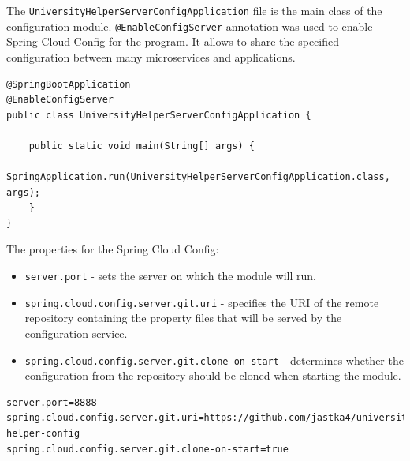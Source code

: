 The \texttt{UniversityHelperServerConfigApplication} file is the main class of the configuration module. \texttt{@EnableConfigServer} annotation was used to enable Spring Cloud Config for the program. It allows to share the specified configuration between many microservices and applications.

\begin{lstlisting}[label=list:server-config-main-class,caption=Server configuration main class, basicstyle=\footnotesize\ttfamily]
@SpringBootApplication
@EnableConfigServer
public class UniversityHelperServerConfigApplication {

	public static void main(String[] args) {
		SpringApplication.run(UniversityHelperServerConfigApplication.class, args);
	}
}
\end{lstlisting}

The properties for the Spring Cloud Config:
\begin{itemize}
    \item \texttt{server.port} - sets the server on which the module will run.
    \item \texttt{spring.cloud.config.server.git.uri} - specifies the URI of the remote repository containing the property files that will be served by the configuration service.
    \item \texttt{spring.cloud.config.server.git.clone-on-start} - determines whether the configuration from the repository should be cloned when starting the module.
\end{itemize}

\begin{lstlisting}[label=list:spring-cloud-config-properties,caption=Spring Cloud Config properties, basicstyle=\footnotesize\ttfamily]
server.port=8888
spring.cloud.config.server.git.uri=https://github.com/jastka4/university-helper-config
spring.cloud.config.server.git.clone-on-start=true
\end{lstlisting}

